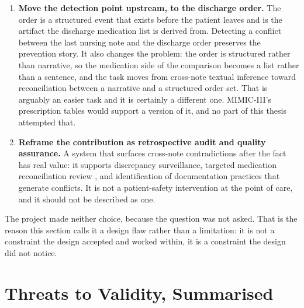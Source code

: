 \begin{enumerate}
\item \textbf{Move the detection point upstream, to the discharge order.} The
      order is a structured event that exists before the patient leaves and is
      the artifact the discharge medication list is derived from. Detecting a
      conflict between the last nursing note and the discharge order preserves
      the prevention story. It also changes the problem: the order is structured
      rather than narrative, so the medication side of the comparison becomes a
      list rather than a sentence, and the task moves from cross-note textual
      inference toward reconciliation between a narrative and a structured
      order set. That is arguably an easier task and it is certainly a different
      one. MIMIC-III's prescription tables would support a version of it, and no
      part of this thesis attempted that.
\item \textbf{Reframe the contribution as retrospective audit and quality
      assurance.} A system that surfaces cross-note contradictions after the
      fact has real value: it supports discrepancy surveillance, targeted
      medication reconciliation review \citep{wong2008reconciliation}, and
      identification of documentation practices that generate conflicts. It is
      not a patient-safety intervention at the point of care, and it should not
      be described as one.
\end{enumerate}

The project made neither choice, because the question was not asked. That is the
reason this section calls it a design flaw rather than a limitation: it is not a
constraint the design accepted and worked within, it is a constraint the design
did not notice.

\section{Threats to Validity, Summarised}
\label{sec:disc-threats}

